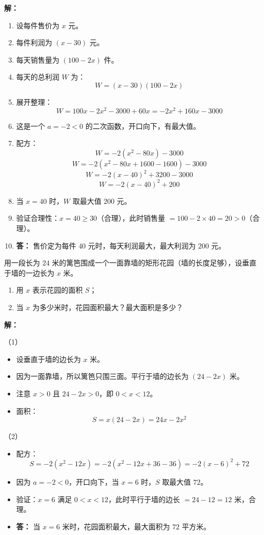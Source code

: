 \documentclass[12pt, a4paper]{ctexart}
\begin{document}
\textbf{解：}
\begin{enumerate}[leftmargin=2em]
  \item 设每件售价为 $x$ 元。
  \item 每件利润为 $(x - 30)$ 元。
  \item 每天销售量为 $(100 - 2x)$ 件。
  \item 每天的总利润 $W$ 为：
  \[
  W = (x - 30)(100 - 2x)
  \]
  \item 展开整理：
  \[
  W = 100x - 2x^2 - 3000 + 60x = -2x^2 + 160x - 3000
  \]
  \item 这是一个 $a = -2 < 0$ 的二次函数，开口向下，有最大值。
  \item 配方：
  \[
  W = -2(x^2 - 80x) - 3000
  \]
  \[
  W = -2(x^2 - 80x + 1600 - 1600) - 3000
  \]
  \[
  W = -2(x - 40)^2 + 3200 - 3000
  \]
  \[
  W = -2(x - 40)^2 + 200
  \]
  \item 当 $x = 40$ 时，$W$ 取最大值 $200$ 元。
  \item 验证合理性：$x = 40 \geq 30$（合理），此时销售量 $= 100 - 2 \times 40 = 20 > 0$（合理）。
  \item \textbf{答：} 售价定为每件 $40$ 元时，每天利润最大，最大利润为 $200$ 元。
\end{enumerate}

\begin{appbox}[【应用 2】面积最值问题]
用一段长为 $24$ 米的篱笆围成一个一面靠墙的矩形花园（墙的长度足够），设垂直于墙的一边长为 $x$ 米。
\begin{enumerate}[label=(\arabic*)]
  \item 用 $x$ 表示花园的面积 $S$；
  \item 当 $x$ 为多少米时，花园面积最大？最大面积是多少？
\end{enumerate}
\end{appbox}

\textbf{解：}

（1）
\begin{itemize}[leftmargin=2em]
  \item 设垂直于墙的边长为 $x$ 米。
  \item 因为一面靠墙，所以篱笆只围三面。平行于墙的边长为 $(24 - 2x)$ 米。
  \item 注意 $x > 0$ 且 $24 - 2x > 0$，即 $0 < x < 12$。
  \item 面积：
  \[
  S = x(24 - 2x) = 24x - 2x^2
  \]
\end{itemize}

（2）
\begin{itemize}[leftmargin=2em]
  \item 配方：
  \[
  S = -2(x^2 - 12x) = -2(x^2 - 12x + 36 - 36) = -2(x - 6)^2 + 72
  \]
  \item 因为 $a = -2 < 0$，开口向下，当 $x = 6$ 时，$S$ 取最大值 $72$。
  \item 验证：$x = 6$ 满足 $0 < x < 12$，此时平行于墙的边长 $= 24 - 12 = 12$ 米，合理。
  \item \textbf{答：} 当 $x = 6$ 米时，花园面积最大，最大面积为 $72$ 平方米。
\end{itemize}
\end{document}
